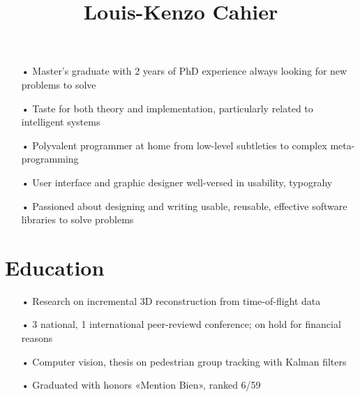 \documentclass{cv}
\title{Louis-Kenzo Cahier}
\begin{document}
 
	\maketitle
	
	\begin{adjustwidth}{-3.5cm}{0cm}  %
		\begin{itemize}
			\item[•] Master's graduate with 2 years of PhD experience always looking for new problems to solve
			\item[•] Taste for both theory and implementation, particularly related to intelligent systems
			\item[•] Polyvalent programmer at home from low-level subtleties to complex meta-programming
			\item[•] User interface and graphic designer well-versed in usability, typograhy
			\item[•] Passioned about designing and writing usable, reusable, effective software libraries to solve problems
		\end{itemize}
	\end{adjustwidth}
	
	\section{Education}
		\begin{position}[title={PhD candidate in Computer Science/Artificial Intelligence},
		                 institution={Kyoto University},
		                 country=Japan,
		                 from=2010,
		                 to=present]
		      \vspace{-\baselineskip} %
			\begin{itemize}
				\item[•] Research on incremental 3D reconstruction from time-of-flight data
				\item[•] 3 national, 1 international peer-reviewd conference; on hold for financial reasons
			\end{itemize}
		\end{position}

		\vspace{0.2\baselineskip} %

		\begin{position}[title={Master's degree in Computer Science},
		                 institution={Université de Nice Sophia-Antipolis},
		                 country=France,
		                 from=2006,
		                 to=2008]
		      \vspace{-\baselineskip} %
			\begin{itemize}
				\item[•] Computer vision, thesis on pedestrian group tracking with Kalman filters
				\item[•] Graduated with honors «Mention Bien», ranked { 6/59}
			\end{itemize}
		\end{position}
\end{document}
